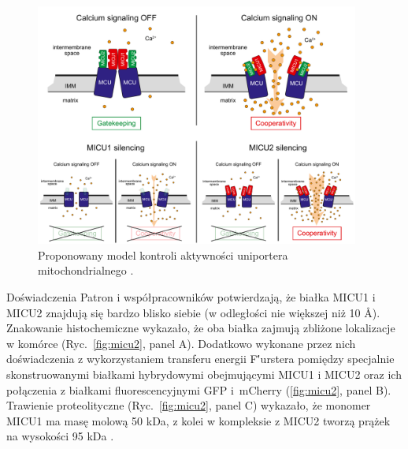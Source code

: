 \begin{figure}[ht]
\centering
\includegraphics[width=0.95\textwidth]{rysunki/rozdzial_1/micu2control.png}
\caption[Proponowany model kontroli uniportera]{Proponowany model kontroli aktywności uniportera mitochondrialnego \cite{Patron2014}.}
\label{fig:micu2control}
\end{figure}

Doświadczenia Patron i współpracowników potwierdzają, że białka MICU1 i MICU2 znajdują się bardzo blisko siebie (w odległości nie większej niż 10 \AA). Znakowanie histochemiczne wykazało, że oba białka zajmują zbliżone lokalizacje w komórce (Ryc.~\ref{fig:micu2}, panel A). Dodatkowo wykonane przez nich doświadczenia z wykorzystaniem transferu energii F\''{u}rstera pomiędzy specjalnie skonstruowanymi białkami hybrydowymi obejmującymi MICU1 i MICU2 oraz ich połączenia z białkami fluorescencyjnymi GFP i~mCherry (\ref{fig:micu2}, panel B). Trawienie proteolityczne (Ryc.~\ref{fig:micu2}, panel C) wykazało, że monomer MICU1 ma masę molową 50 kDa, z kolei w kompleksie z MICU2 tworzą prążek na wysokości 95 kDa \cite{Patron2014}. 

